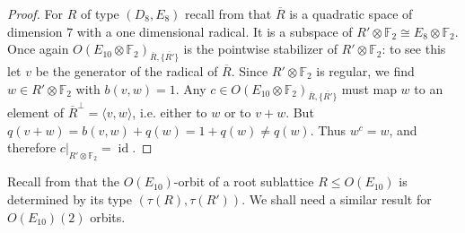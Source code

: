\documentclass[a4paper]{amsart}
\theoremstyle{definition}
\theoremstyle{plain}
\DeclareMathOperator{\id}{id}
\newcommand{\FF}{\mathbb{F}}
\begin{document}
\begin{proof}
For $R$ of type $(D_8,E_8)$ recall from  that $\overline{R}$ is a quadratic space of dimension $7$ with a one dimensional radical. It is a subspace of $R' \otimes \FF_2 \cong E_8 \otimes \FF_2$. 
Once again $O(E_{10}\otimes \FF_2)_{\overline{R}, \{\overline{R'}\}}$ is the pointwise stabilizer of $R'\otimes \FF_2$: to see this let $v$ be the generator of the radical of $\overline{R}$. Since $R'\otimes \FF_2$ is regular, we find $w \in R'\otimes \FF_2$ with $b(v,w)=1$. Any $c \in O(E_{10}\otimes \FF_2)_{\overline{R},\{\overline{R'}\}}$ must map $w$ to an element of $\overline{R}^\perp = \langle v,w \rangle$, i.e.
either to $w$ or to $v+w$. But $q(v+w)=b(v,w)+q(w) = 1+q(w) \neq q(w)$. Thus $w^c=w$, and therefore $c|_{R'\otimes \FF_2}=\id$.
\end{proof}

Recall from  that the $O(E_{10})$-orbit of a root sublattice $R \leq O(E_{10})$ is determined by its type $(\tau(R),\tau(R'))$. 
We shall need a similar result for $O(E_{10})(2)$ orbits.
\end{document}
